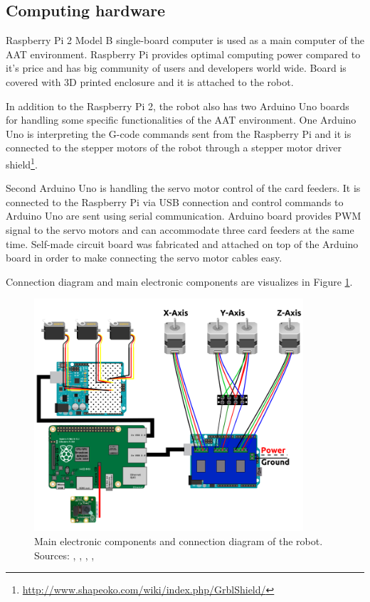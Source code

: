 \subsection{Computing hardware}
\label{subsection:Computing hardware}

Raspberry Pi 2 Model B single-board computer is used as a main computer of the AAT environment. Raspberry Pi provides optimal computing power compared to it's price and has big community of users and developers world wide. Board is covered with 3D printed enclosure and it is attached to the robot.

In addition to the Raspberry Pi 2, the robot also has two Arduino Uno boards for handling some specific functionalities of the AAT environment. One Arduino Uno is interpreting the G-code commands sent from the Raspberry Pi and it is connected to the stepper motors of the robot through a stepper motor driver shield\footnote{\url{http://www.shapeoko.com/wiki/index.php/GrblShield/}}.

Second Arduino Uno is handling the servo motor control of the card feeders. It is connected to the Raspberry Pi via USB connection and control commands to Arduino Uno are sent using serial communication. Arduino board provides PWM signal to the servo motors and can accommodate three card feeders at the same time. Self-made circuit board was fabricated and attached on top of the Arduino board in order to make connecting the servo motor cables easy.

Connection diagram and main electronic components are visualizes in Figure \ref{fig:electronics}. 

\begin{figure}[ht]
  \begin{center}
    \includegraphics[width=10cm]{images/electronics.png}
    \caption{Main electronic components and connection diagram of the robot. Sources: \emph{\cite{image1}}, \emph{\cite{image2}}, \emph{\cite{image3}}, \emph{\cite{image4}}, \emph{\cite{image5}}}
    \label{fig:electronics}
  \end{center}
\end{figure}
\FloatBarrier

